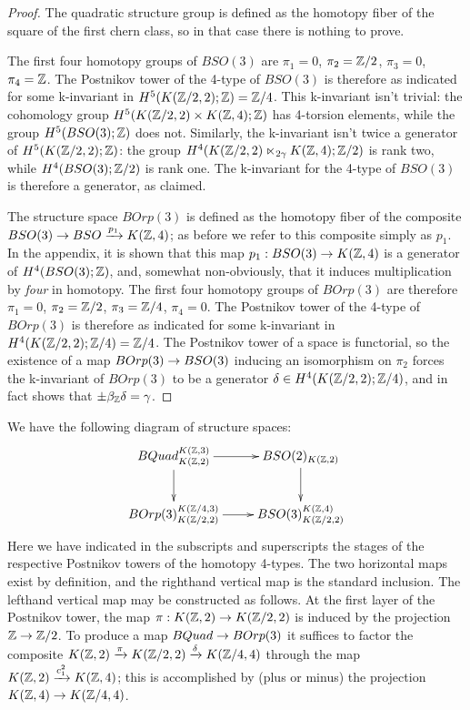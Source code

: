 \documentclass{amsart}
\begin{document}
\begin{proof}
The quadratic structure group is defined as the homotopy fiber of the square of the first chern class, so in that case there is nothing to prove.

The first four homotopy groups of $BSO(3)$ are $\pi_1 = 0$, $\pi_2 = \mathbb Z/2$, $\pi_3 = 0$, $\pi_4 = \mathbb Z$.  The Postnikov tower of the 4-type of $BSO(3)$ is therefore as indicated for some k-invariant in $H^5(K(\mathbb Z/2,2);\mathbb Z) = \mathbb Z/4$.  This k-invariant isn't trivial: the cohomology group $H^5(K(\mathbb Z/2,2) \times K(\mathbb Z,4);\mathbb Z)$ has 4-torsion elements, while the group $H^5(BSO(3);\mathbb Z)$ does not.  Similarly, the k-invariant isn't twice a generator of $H^5(K(\mathbb Z/2,2);\mathbb Z)$: the group $H^4(K(\mathbb Z/2,2) \ltimes_{2\gamma} K(\mathbb Z,4);\mathbb Z/2)$ is rank two, while $H^4(BSO(3);\mathbb Z/2)$ is rank one.  The k-invariant for the 4-type of $BSO(3)$ is therefore a generator, as claimed.

The structure space $BOrp(3)$ is defined as the homotopy fiber of the composite $BSO(3) \rightarrow BSO \xrightarrow{p_1} K(\mathbb Z,4)$; as before we refer to this composite simply as $p_1$.  In the appendix, it is shown that this map $p_1: BSO(3) \rightarrow K(\mathbb Z,4)$ is a generator of $H^4(BSO(3);\mathbb Z)$, and, somewhat non-obviously, that it induces multiplication by \emph{four} in homotopy.  The first four homotopy groups of $BOrp(3)$ are therefore $\pi_1 = 0$, $\pi_2 = \mathbb Z/2$, $\pi_3 = \mathbb Z/4$, $\pi_4 = 0$.  The Postnikov tower of the 4-type of $BOrp(3)$ is therefore as indicated for some k-invariant in $H^4(K(\mathbb Z/2,2);\mathbb Z/4) = \mathbb Z/4$.  The Postnikov tower of a space is functorial, so the existence of a map $BOrp(3) \rightarrow BSO(3)$ inducing an isomorphism on $\pi_2$ forces the k-invariant of $BOrp(3)$ to be a generator $\delta \in H^4(K(\mathbb Z/2,2);\mathbb Z/4)$, and in fact shows that $\pm \beta_{\mathbb Z} \delta = \gamma$. 
\end{proof}

We have the following diagram of structure spaces:
\[
\xymatrix{
BQuad_{K(\ZZ,2)}^{K(\ZZ,3)} \ar[r] \ar[d] & BSO(2)_{K(\ZZ,2)} \ar[d] \\
BOrp(3)_{K(\ZZ/2,2)}^{K(\ZZ/4,3)} \ar[r] & BSO(3)_{K(\ZZ/2,2)}^{K(\ZZ,4)}
}
\]
Here we have indicated in the subscripts and superscripts the stages of the respective Postnikov towers of the homotopy 4-types.  The two horizontal maps exist by definition, and the righthand vertical map is the standard inclusion.  The lefthand vertical map may be constructed as follows.  At the first layer of the Postnikov tower, the map $\pi: K(\mathbb Z,2) \rightarrow K(\mathbb Z/2,2)$ is induced by the projection $\mathbb Z \rightarrow \mathbb Z/2$.  To produce a map $BQuad \rightarrow BOrp(3)$ it suffices to factor the composite $K(\mathbb Z,2) \xrightarrow{\pi} K(\mathbb Z/2,2) \xrightarrow{\delta} K(\mathbb Z/4,4)$ through the map $K(\mathbb Z,2) \xrightarrow{c_1^2} K(\mathbb Z,4)$; this is accomplished by (plus or minus) the projection $K(\mathbb Z,4) \rightarrow K(\mathbb Z/4,4)$.  %
\end{document}
